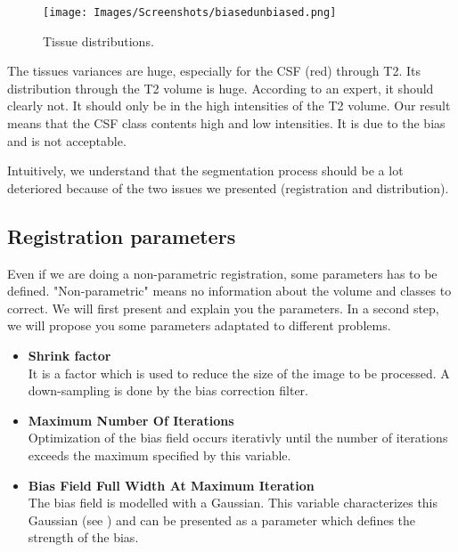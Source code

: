 \begin{figure}\centering
  \texttt{[image: Images/Screenshots/biasedunbiased.png]}
  \caption{Tissue distributions.}\label{fig:biasedunbiased}
\end{figure}
The tissues variances are huge, especially for the CSF (red) through T2. Its distribution through the T2 volume is huge. According to an expert, it should clearly not. It should only be in the high intensities of the T2 volume. Our result means that the CSF class contents high and low intensities. It is due to the bias and is not acceptable.
\par
Intuitively, we understand that the segmentation process should be a lot deteriored because of the two issues we presented (registration and distribution).
\subsection{Registration parameters}
Even if we are doing a non-parametric registration, some parameters has to be defined. "Non-parametric" means no information about the volume and classes to correct. We will first present and explain you the parameters. In a second step, we will propose you some parameters adaptated to different problems.

\begin{itemize}
\item \textbf{Shrink factor}\\
\hspace*{4 mm} It is a factor which is used to reduce the size of the image to be processed. A down-sampling is done by the bias correction filter.

\item \textbf{Maximum Number Of Iterations}\\
\hspace*{4 mm} Optimization of the bias field occurs iterativly until the number of iterations exceeds the maximum specified by this variable.

\item \textbf{Bias Field Full Width At Maximum Iteration}\\
\hspace*{4 mm} The bias field is modelled with a Gaussian. This variable characterizes this Gaussian (see \cite{20}) and can be presented as a parameter which defines the strength of the bias.
\end{itemize}

